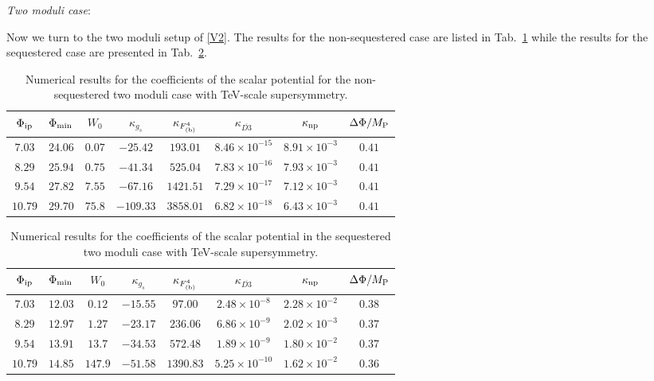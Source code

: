 \documentclass[12pt,a4paper]{book}
\begin{document}
\item \textit{Two moduli case}: 

Now we turn to the two moduli setup of \eqref{V2}. The results for the non-sequestered case are listed in Tab.~\ref{tab5} while the results for the sequestered case are presented in Tab.~\ref{tab6}.
\begin{table}[H]
\begin{center}
\begin{tabular}{cccccccc}
\hline
$\Phi_{\rm ip}$ & $\Phi_{\rm min}$ & $W_0$ & $\kappa_{g_s}$ & $\kappa_{F^4_{\rm (b)}}$ & $\kappa_{\overline{D3}}$ & $\kappa_{\rm np}$ & $\Delta \Phi/M_{\rm P}$ \\
\hline
$7.03$ & $24.06$ & $0.07$ & $-25.42$ & $193.01$ & $8.46 \times 10^{-15}$  & $8.91 \times 10^{-3}$ & $0.41$\\
\hline
$8.29$ & $25.94$ & $0.75$ & $-41.34$ & $525.04$ & $7.83 \times 10^{-16}$ & $7.93 \times 10^{-3}$ & $0.41$ \\
\hline
$9.54$ & $27.82$ & $7.55$ & $-67.16$ & $1421.51$ & $7.29 \times 10^{-17}$ & $7.12 \times 10^{-3}$ & $0.41$ \\
\hline
$10.79$ & $29.70$ & $75.8$ & $-109.33$ & $3858.01$ & $6.82 \times 10^{-18}$ & $6.43 \times 10^{-3}$ & $0.41$ \\
\hline
\end{tabular}
\end{center}
\caption{Numerical results for the coefficients of the scalar potential for the non-sequestered two moduli case with TeV-scale supersymmetry.}
\label{tab5}
\end{table}

\begin{table}[H]
\begin{center}
\begin{tabular}{cccccccc}
\hline
$\Phi_{\rm ip}$ & $\Phi_{\rm min}$ & $W_0$ & $\kappa_{g_s}$ & $\kappa_{F^4_{\rm (b)}}$ & $\kappa_{\overline{D3}}$ & $\kappa_{\rm np}$ & $\Delta \Phi/M_{\rm P}$ \\
\hline
$7.03$ & $12.03$ & $0.12$ & $-15.55$ & $97.00$ & $2.48 \times 10^{-8}$  & $2.28 \times 10^{-2}$ & $0.38$ \\
\hline
$8.29$ & $12.97$ & $1.27$ & $-23.17$ & $236.06$ & $6.86 \times 10^{-9}$ & $2.02 \times 10^{-3}$ & $0.37$ \\
\hline
$9.54$ & $13.91$ & $13.7$ & $-34.53$ & $572.48$ & $1.89 \times 10^{-9}$ & $1.80 \times 10^{-2}$ & $0.37$ \\
\hline
$10.79$ & $14.85$ & $147.9$ & $-51.58$ & $1390.83$ & $5.25 \times 10^{-10}$ & $1.62 \times 10^{-2}$ & $0.36$ \\
\hline
\end{tabular}
\end{center}
\caption{Numerical results for the coefficients of the scalar potential in the sequestered two moduli case with TeV-scale supersymmetry.}
\label{tab6}
\end{table}
\end{document}
